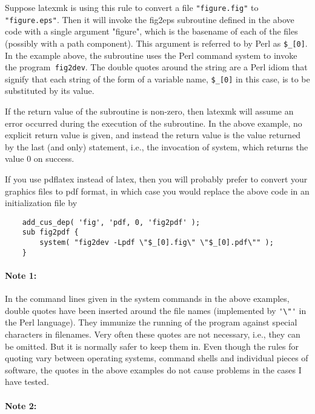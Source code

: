 Suppose  latexmk  is  using this rule to convert a file \verb|"figure.fig"| to
\verb|"figure.eps"|.  Then it will invoke the fig2eps  subroutine  defined  in the
above  code with a single argument "figure", which is the basename of each of
the files (possibly with a path component).   This  argument is  referred to by
Perl as \verb|$_[0]|.  In the example above, the subroutine uses the Perl command
system to invoke the program\verb| fig2dev|.  The double quotes around the string are
a Perl idiom that signify that each string of the form of a variable name,
\verb|$_[0]| in this case, is  to  be  substituted by its value.

If  the  return  value of the subroutine is non-zero, then latexmk will assume
an error occurred during the execution of  the  subroutine.   In the  above
example, no explicit return value is given, and instead the return value is the
value returned by the last  (and  only)  statement, i.e., the invocation of
system, which returns the value 0 on success.

If  you use pdflatex instead of latex, then you will probably prefer to convert
your graphics files to pdf format, in which case you would replace the above
code in an initialization file by

\begin{verbatim}
	add_cus_dep( 'fig', 'pdf, 0, 'fig2pdf' );
	sub fig2pdf {
		system( "fig2dev -Lpdf \"$_[0].fig\" \"$_[0].pdf\"" );
	}
\end{verbatim}

\paragraph{Note  1:}

In the command lines given in the system commands in the above
examples, double quotes  have  been  inserted  around  the  file  names
(implemented  by \verb|'\"'| in the Perl language).  They immunize the running
of the program against special characters  in  filenames.   Very  often
these  quotes  are not necessary, i.e., they can be omitted.  But it is
normally safer to keep them in.  Even though the rules for quoting vary
between  operating  systems,  command  shells  and individual pieces of
software, the quotes in the above examples do not cause problems in the
cases I have tested.

\paragraph{Note  2:}

